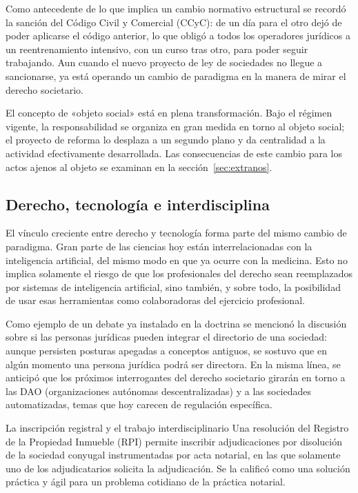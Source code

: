 \documentclass[12pt,oneside]{book}
\begin{document}
Como antecedente de lo que implica un cambio normativo estructural se recordó la sanción del Código Civil y Comercial (CCyC): de un día para el otro dejó de poder aplicarse el código anterior, lo que obligó a todos los operadores jurídicos a un reentrenamiento intensivo, con un curso tras otro, para poder seguir trabajando. Aun cuando el nuevo proyecto de ley de sociedades no llegue a sancionarse, ya está operando un cambio de paradigma en la manera de mirar el derecho societario.

\begin{note}
El concepto de «objeto social» está en plena transformación. Bajo el régimen vigente, la responsabilidad se organiza en gran medida en torno al objeto social; el proyecto de reforma lo desplaza a un segundo plano y da centralidad a la actividad efectivamente desarrollada. Las consecuencias de este cambio para los actos ajenos al objeto se examinan en la sección~\ref{sec:extranos}.
\end{note}

\subsection{Derecho, tecnología e interdisciplina}

El vínculo creciente entre derecho y tecnología forma parte del mismo cambio de paradigma. Gran parte de las ciencias hoy están interrelacionadas con la inteligencia artificial, del mismo modo en que ya ocurre con la medicina. Esto no implica solamente el riesgo de que los profesionales del derecho sean reemplazados por sistemas de inteligencia artificial, sino también, y sobre todo, la posibilidad de usar esas herramientas como colaboradoras del ejercicio profesional.

Como ejemplo de un debate ya instalado en la doctrina se mencionó la discusión sobre si las personas jurídicas pueden integrar el directorio de una sociedad: aunque persisten posturas apegadas a conceptos antiguos, se sostuvo que en algún momento una persona jurídica podrá ser directora. En la misma línea, se anticipó que los próximos interrogantes del derecho societario girarán en torno a las DAO (organizaciones autónomas descentralizadas) y a las sociedades automatizadas, temas que hoy carecen de regulación específica.

\begin{example}{La inscripción registral y el trabajo interdisciplinario}
Una resolución del Registro de la Propiedad Inmueble (RPI) permite inscribir adjudicaciones por disolución de la sociedad conyugal instrumentadas por acta notarial, en las que solamente uno de los adjudicatarios solicita la adjudicación. Se la calificó como una solución práctica y ágil para un problema cotidiano de la práctica notarial.
\end{example}
\end{document}
